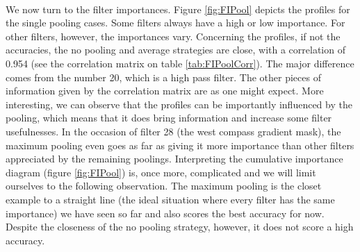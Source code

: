 \documentclass[a4paper]{report}
\begin{document}
	\paragraph{}
	We now turn to the filter importances. Figure \ref{fig:FIPool} depicts the profiles for the single pooling cases. Some filters always have a high or low importance. For other filters, however, the importances vary. Concerning the profiles, if not the accuracies, the no pooling and average strategies are close, with a correlation of 0.954 (see the correlation matrix on table \ref{tab:FIPoolCorr}). The major difference comes from the number 20, which is a high pass filter. %
	The other pieces of information given by the correlation matrix are as one might expect.
	More interesting, we can observe that the profiles can be importantly influenced by the pooling, which means that it does bring information and increase some filter usefulnesses. In the occasion of filter 28 (the west compass gradient mask), the maximum pooling even goes as far as giving it more importance than other filters appreciated by the remaining poolings. 
	Interpreting the cumulative importance diagram (figure \ref{fig:FIPool}) is, once more, complicated and we will limit ourselves to the following observation. The maximum pooling is the closet example to a straight line (the ideal situation where every filter has the same importance) we have seen so far and also scores the best accuracy for now. Despite the closeness of the no pooling strategy, however, it does not score a high accuracy.
	
\end{document}

